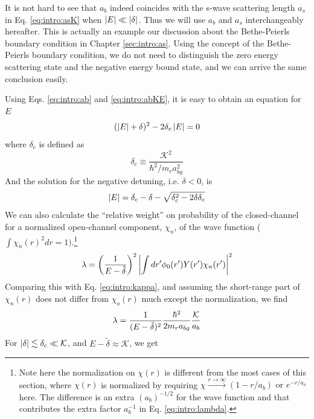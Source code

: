 It is not hard to see that $a_{b}$ indeed  coincides with the s-wave scattering length $a_{s}$ in Eq. \ref{eq:intro:asK} when $\left\lvert{E}\right\rvert\ll\left\lvert{\delta}\right\rvert$. Thus we will use $a_{b}$ and $a_{s}$ interchangeably hereafter. This is actually an example our discussion about the Bethe-Peierls boundary condition in Chapter \ref{sec:intro:as}. Using the concept of the Bethe-Peierls boundary condition, we do not need to distinguish the zero energy scattering state and the negative energy bound state, and we can arrive the same conclusion easily.  

  Using Eqs. \ref{eq:intro:ab} and \ref{eq:intro:abKE}, it is easy to obtain an equation for $E$
\begin{equation}
(\left\lvert{E}\right\rvert+\delta)^{2}-2\delta_{c}\left\lvert{E}\right\rvert=0 
\end{equation}
where $\delta_{c}$ is defined as 
\begin{equation}\label{eq:intro:deltaC}
\delta_{c}\equiv\frac{\mathcal{K}^{2}}{\hbar^{2}/m_{r}a_{bg}^{2}}
\end{equation}
And the solution for the negative detuning, i.e. $\delta<0$, is
\begin{equation}\label{eq:intro:bindE}
\left\lvert{E}\right\rvert=\delta_{c}-\delta-\sqrt{\delta_{c}^{2}-2\delta\delta_{c}}
\end{equation}
We can also calculate the ``relative weight'' on probability of the closed-channel for a normalized open-channel component, $\chi_{n}$, of the wave function ($\int{}\chi_{n}(r)^{2}dr=1). $\footnote{Note here the normalization on $\chi(r)$ is different from the most cases of this section, where $\chi(r)$ is normalized by  requiring $\chi{}\overset{r\rightarrow\infty}\rightarrow{}(1-r/a_{b})\text{ or }e^{-r/a_{b}} $ here. The difference is an extra $(a_{b})^{-1/2}$ for the wave function and that contributes the extra factor $a_{b}^{-1}$ in Eq. \ref{eq:intro:lambda}.} 
\begin{equation}
\lambda=\left(\frac{1}{E-\tilde\delta}\right)^{2}\left\lvert{\int{}dr'\phi_{0}(r')Y(r')\chi_{n}(r')}\right\rvert^{2}
\end{equation}
Comparing this with Eq. \ref{eq:intro:kappa}, and assuming the short-range part of $\chi_{n}(r)$ does not differ from $\chi_{o}(r)$ much except the normalization, we  find 
\begin{equation}\label{eq:intro:lambda}
\lambda=\frac{1}{(E-\tilde\delta)^{2}}\frac{\hbar^{2}}{2m_{r}a_{bg}}\frac{\mathcal{K}}{a_{b}}
\end{equation}
For $\left\lvert{\delta}\right\rvert\lesssim\delta_{c}\ll\mathcal{K}$,  and $E-\tilde\delta\approx\mathcal{K}$, we get 
